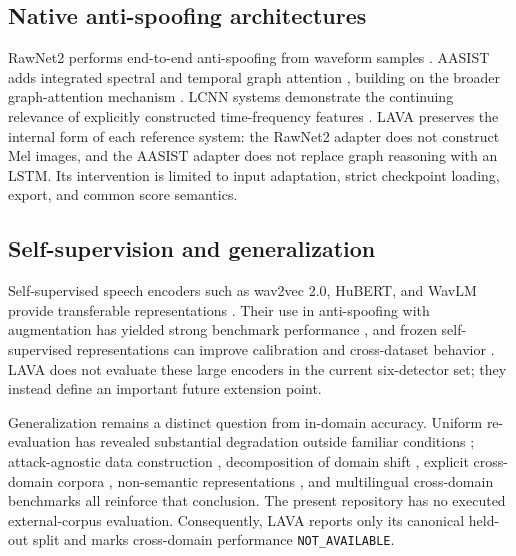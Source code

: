 \documentclass[10pt,journal]{IEEEtran}
\begin{document}
\subsection{Native anti-spoofing architectures}
RawNet2 performs end-to-end anti-spoofing from waveform samples \cite{tak2021rawnet2}. AASIST adds integrated spectral and temporal graph attention \cite{jung2022aasist}, building on the broader graph-attention mechanism \cite{velickovic2018gat}. LCNN systems demonstrate the continuing relevance of explicitly constructed time-frequency features \cite{wu2020lcnn}. LAVA preserves the internal form of each reference system: the RawNet2 adapter does not construct Mel images, and the AASIST adapter does not replace graph reasoning with an LSTM. Its intervention is limited to input adaptation, strict checkpoint loading, export, and common score semantics.

\subsection{Self-supervision and generalization}
Self-supervised speech encoders such as wav2vec 2.0, HuBERT, and WavLM provide transferable representations \cite{baevski2020wav2vec,hsu2021hubert,chen2022wavlm}. Their use in anti-spoofing with augmentation has yielded strong benchmark performance \cite{tak2022wav2vec}, and frozen self-supervised representations can improve calibration and cross-dataset behavior \cite{pascu2024calibrated}. LAVA does not evaluate these large encoders in the current six-detector set; they instead define an important future extension point.

Generalization remains a distinct question from in-domain accuracy. Uniform re-evaluation has revealed substantial degradation outside familiar conditions \cite{muller2022generalize}; attack-agnostic data construction \cite{kawa2022attack}, decomposition of domain shift \cite{muller2024harder}, explicit cross-domain corpora \cite{li2024crossdomain}, non-semantic representations \cite{das2025nonsemantic}, and multilingual cross-domain benchmarks \cite{ciobanu2026xmad} all reinforce that conclusion. The present repository has no executed external-corpus evaluation. Consequently, LAVA reports only its canonical held-out split and marks cross-domain performance \texttt{NOT\_AVAILABLE}.
\end{document}

